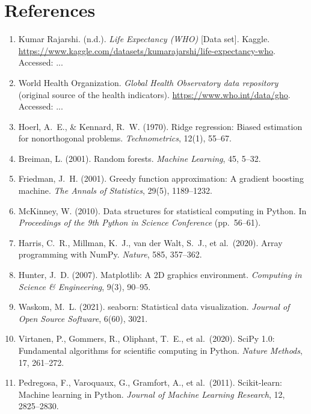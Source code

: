 \documentclass[12pt,a4paper]{article}
\begin{document}
\section{References}
\begin{enumerate}
  \item Kumar Rajarshi. (n.d.). \emph{Life Expectancy (WHO)} [Data set]. Kaggle.
        \url{https://www.kaggle.com/datasets/kumarajarshi/life-expectancy-who}.
        Accessed: ...
  \item World Health Organization. \emph{Global Health Observatory data repository}
        (original source of the health indicators).
        \url{https://www.who.int/data/gho}. Accessed: ...
  \item Hoerl, A.\ E., \& Kennard, R.\ W. (1970). Ridge regression: Biased estimation
        for nonorthogonal problems. \emph{Technometrics}, 12(1), 55--67.
  \item Breiman, L. (2001). Random forests. \emph{Machine Learning}, 45, 5--32.
  \item Friedman, J.\ H. (2001). Greedy function approximation: A gradient boosting
        machine. \emph{The Annals of Statistics}, 29(5), 1189--1232.
  \item McKinney, W. (2010). Data structures for statistical computing in Python.
        In \emph{Proceedings of the 9th Python in Science Conference} (pp.\ 56--61).
  \item Harris, C.\ R., Millman, K.\ J., van der Walt, S.\ J., et al.\ (2020).
        Array programming with NumPy. \emph{Nature}, 585, 357--362.
  \item Hunter, J.\ D. (2007). Matplotlib: A 2D graphics environment.
        \emph{Computing in Science \& Engineering}, 9(3), 90--95.
  \item Waskom, M.\ L. (2021). seaborn: Statistical data visualization.
        \emph{Journal of Open Source Software}, 6(60), 3021.
  \item Virtanen, P., Gommers, R., Oliphant, T.\ E., et al.\ (2020). SciPy 1.0:
        Fundamental algorithms for scientific computing in Python.
        \emph{Nature Methods}, 17, 261--272.
  \item Pedregosa, F., Varoquaux, G., Gramfort, A., et al.\ (2011). Scikit-learn:
        Machine learning in Python. \emph{Journal of Machine Learning Research},
        12, 2825--2830.
\end{enumerate}
\end{document}
